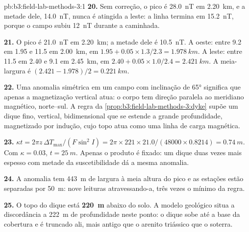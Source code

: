 \begin{solution}{pb:b3:field-lab-methods-3:1}
\textbf{20.} Sem correção, o pico é \qty{28.0}{nT} em \qty{2.20}{km}, e
a metade dele, \qty{14.0}{nT}, nunca é atingida a leste: a linha termina
em \qty{15.2}{nT}, porque o campo subiu \qty{12}{nT} durante a
caminhada.

\textbf{21.} O pico é \qty{21.0}{nT} em \qty{2.20}{km}; a metade dele é
\qty{10.5}{nT}. A oeste: entre \num{9.2} em \num{1.95} e \num{11.5} em
\qty{2.00}{km}, em $1.95 + 0.05\times1.3/2.3 = \qty{1.978}{km}$. A leste:
entre \num{11.5} em \num{2.40} e \num{9.1} em \qty{2.45}{km}, em
$2.40 + 0.05\times1.0/2.4 = \qty{2.421}{km}$. A meia-largura é $(2.421
- 1.978)/2 = \qty{0.221}{km}$.

\textbf{22.} Uma anomalia simétrica em um campo com inclinação de \ang{65} significa que apenas
a magnetização vertical atua: o corpo tem direção paralela ao
meridiano magnético, norte--sul. A regra
da \cref{prop:b3:field-lab-methods-3:dyke} supõe um dique fino, vertical,
bidimensional que se estende a grande profundidade, magnetizado por indução, cujo
topo atua como uma linha de carga magnética.

\textbf{23.} $\kappa t = 2\pi z\,\Delta T_\mathrm{max}/(F\sin^2 I) = 2\pi\times
221\times21.0/(48000\times0.8214) = \qty{0.74}{m}$. Com $\kappa =
0.03$, $t = \qty{25}{m}$. Apenas o produto é fixado: um dique duas vezes
mais espesso com metade da suscetibilidade dá a mesma anomalia.

\textbf{24.} A anomalia tem \qty{443}{m} de largura à meia altura do pico e as estações
estão separadas por \qty{50}{m}: nove leituras atravessando-a, três vezes o
mínimo da regra.

\textbf{25.} O topo do dique está
\textbf{\qty[text-series-to-math=true]{220}{m}} abaixo do solo. A
modelo geológico situa a discordância a \qty{222}{m} de profundidade neste ponto:
o dique sobe até a base da cobertura e é truncado ali, mais antigo
que o arenito triássico que o soterra.
\end{solution}
